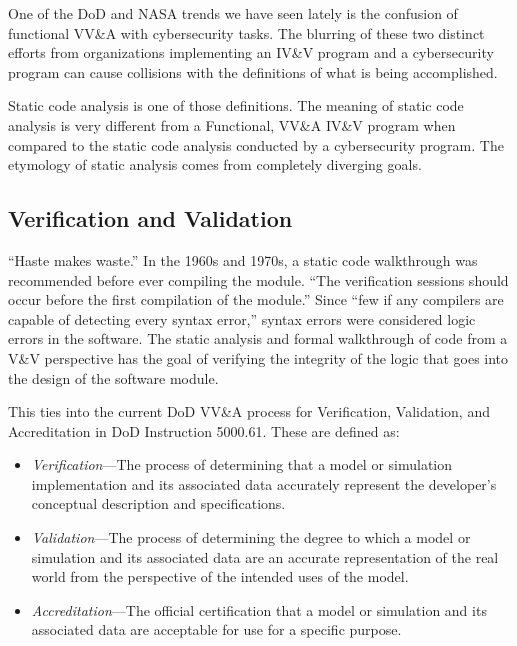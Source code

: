 One of the DoD and NASA trends we have seen lately is the confusion of functional VV\&A with cybersecurity tasks. The blurring of these two distinct efforts from organizations implementing an IV\&V program and a cybersecurity program can cause collisions with the definitions of what is being accomplished.

Static code analysis is one of those definitions. The meaning of static code analysis is very different from a Functional, VV\&A IV\&V program when compared to the static code analysis conducted by a cybersecurity program. The etymology of static analysis comes from completely diverging goals.

\subsection{Verification and Validation}
``Haste makes waste.'' In the 1960s and 1970s, a static code walkthrough was recommended before ever compiling the module. ``The verification sessions should occur before the first compilation of the module.'' Since ``few if any compilers are capable of detecting every syntax error,'' syntax errors were considered logic errors in the software.\autocite[\ppno~144,149,292]{20230918:myers1976} The static analysis and formal walkthrough of code from a V\&V perspective has the goal of verifying the integrity of the logic that goes into the design of the software module.

This ties into the current DoD VV\&A process for Verification, Validation, and Accreditation in DoD Instruction 5000.61. These are defined as:\autocite{20230918:dodi500061}
\begin{itemize}
	\item \textit{Verification}---The process of determining that a model or simulation implementation and its associated data accurately represent the developer's conceptual description and specifications.
	\item \textit{Validation}---The process of determining the degree to which a model or simulation and its associated data are an accurate representation of the real world from the perspective of the intended uses of the model.
	\item \textit{Accreditation}---The official certification that a model or simulation and its associated data are acceptable for use for a specific purpose.
\end{itemize}

